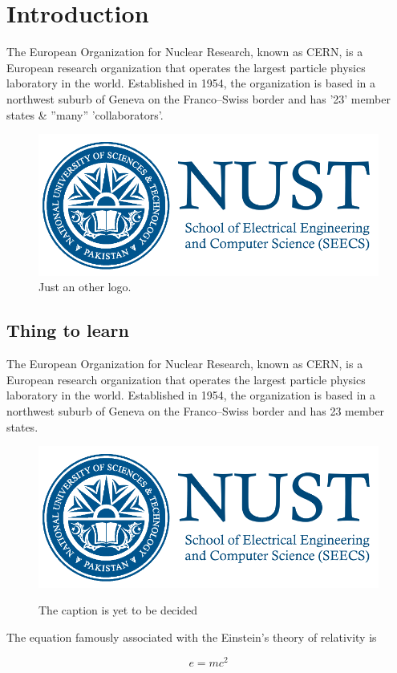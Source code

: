 \section{Introduction}
The European Organization for Nuclear Research, known as CERN, is a European research organization that operates the largest particle physics laboratory in the world. Established in 1954, the organization is based in a northwest suburb of Geneva on the Franco–Swiss border and has '23' member states \& ''many'' 'collaborators'.

\begin{figure}[h]
    \centering
    \includegraphics[width=0.5\linewidth]{figs/nustSeecsTransparent.png}
    \caption{Just an other logo.}
    \label{fig:logowithnust}
\end{figure}

\subsection{Thing to learn}
The European 
Organization 
for Nuclear
Research, 
known as CERN, 
is a European 
research organization 
that operates the largest particle physics laboratory in the world. Established in 1954, the organization is based in a northwest suburb of Geneva on the Franco–Swiss border and has 23 member states.


\begin{figure}[hpb]
    \centering
    \caption{The caption is yet to be decided}
    \includegraphics[width=0.5\linewidth]{figs/nustSeecsTransparent.png}
    \label{fig:anotherlogowithnust}
\end{figure}


The equation famously associated with the Einstein's theory of relativity is

\begin{equation}\label{eq1}
 e = m c^2
\end{equation}

